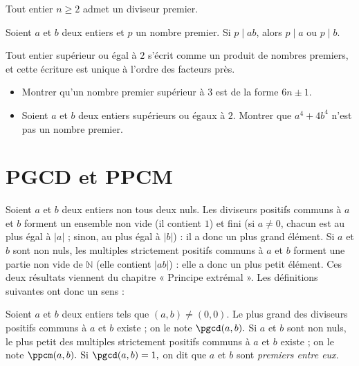 \begin{fact}
	Tout entier $n \geq 2$ admet un diviseur premier.
\end{fact}

\begin{fact}
	Soient $a$ et $b$ deux entiers et $p$ un nombre premier. Si $p \mid ab$, alors $p \mid a$ ou $p \mid b$.
\end{fact}

\begin{fact}
	Tout entier supérieur ou égal à $2$ s'écrit comme un produit de nombres premiers, et cette écriture est unique à l'ordre des facteurs près.
\end{fact}

\begin{exercise}
	\begin{itemize}
		\item[$\bullet$] Montrer qu'un nombre premier supérieur à $3$ est de la forme $6n \pm 1$.
		\item[$\bullet$]Soient $a$ et $b$ deux entiers supérieurs ou égaux à $2$. Montrer que $a^4 + 4b^4$ n'est pas un nombre premier.
	\end{itemize}
\end{exercise}

\section{PGCD et PPCM}

Soient $a$ et $b$ deux entiers non tous deux nuls. Les diviseurs positifs communs à $a$ et $b$ forment un ensemble non vide (il contient $1$) et fini (si $a \neq 0$, chacun est au plus égal à $|a|$ ; sinon, au plus égal à $|b|$) : il a donc un plus grand élément. Si $a$ et $b$ sont non nuls, les multiples strictement positifs communs à $a$ et $b$ forment une partie non vide de $\mathbb{N}$ (elle contient $|ab|$) : elle a donc un plus petit élément. Ces deux résultats viennent du chapitre « Principe extrémal ». Les définitions suivantes ont donc un sens :
\begin{defi}
	Soient $a$ et $b$ deux entiers tels que $(a, b) \neq (0, 0)$. Le plus grand des diviseurs positifs communs à $a$ et $b$ existe ; on le note $\pgcd(a,b).$ Si $a$ et $b$ sont non nuls, le plus petit des multiples strictement positifs communs à $a$ et $b$ existe ; on le note $\ppcm(a,b).$ Si $\pgcd(a,b)=1,$ on dit que $a$ et $b$ sont \textit{premiers entre eux}.
\end{defi}

